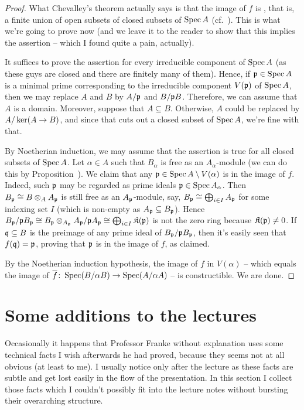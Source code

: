 \documentclass[a4paper,parskip=half,numbers=enddot, DIV=12]{scrreprt}
\begin{document}
\begin{proof}
	What Chevalley's theorem actually says is that the image of $f$ is , that is, a finite union of open subsets of closed subsets of $\operatorname{Spec} A$ (cf.\ \cite[Corollary~14.6]{eisenbudCommAlg}). This is what we're going to prove now (and we leave it to the reader to show that this implies the assertion -- which I found quite a pain, actually).
	
	It suffices to prove the assertion for every irreducible component of $\operatorname{Spec} A$ (as these guys are closed and there are finitely many of them). Hence, if $\mathfrak{p}\in\operatorname{Spec} A$ is a minimal prime corresponding to the irreducible component $V(\mathfrak{p})$ of $\operatorname{Spec} A$, then we may replace $A$ and $B$ by $A/\mathfrak{p}$ and $B/\mathfrak{p} B$. Therefore, we can assume that $A$ is a domain. Moreover, suppose that $A\subseteq B$. Otherwise, $A$ could be replaced by $A/\ker(A\morphism B)$, and since that cuts out a closed subset of $\operatorname{Spec} A$, we're fine with that. 
	
	By Noetherian induction, we may assume that the assertion is true for all closed subsets of $\operatorname{Spec} A$. Let $\alpha\in A$ such that $B_\alpha$ is free as an $A_\alpha$-module (we can do this by Proposition~). We claim that any $\mathfrak{p}\in\operatorname{Spec} A\setminus V(\alpha)$ is in the image of $f$. Indeed, such $\mathfrak{p}$ may be regarded as prime ideals $\mathfrak{p}\in\operatorname{Spec} A_\alpha$. Then $B_{\mathfrak{p}}\cong B\otimes_AA_{\mathfrak{p}}$ is still free as an $A_{\mathfrak{p}}$-module, say, $B_{\mathfrak{p}}\cong \bigoplus_{i\in I}A_{\mathfrak{p}}$ for some indexing set $I$ (which is non-empty as $A_{\mathfrak{p}}\subseteq B_{\mathfrak{p}}$). Hence $B_{\mathfrak{p}}/\mathfrak{p} B_{\mathfrak{p}}\cong B_{\mathfrak{p}}\otimes_{A_{\mathfrak{p}}}A_{\mathfrak{p}}/\mathfrak{p} A_{\mathfrak{p}}\cong \bigoplus_{i\in I}\mathfrak{K}(\mathfrak{p})$ is not the zero ring because $\mathfrak{K}(\mathfrak{p})\neq 0$. If $\mathfrak{q}\subseteq B$ is the preimage of any prime ideal of $B_{\mathfrak{p}}/\mathfrak{p} B_{\mathfrak{p}}$, then it's easily seen that $f(\mathfrak{q})=\mathfrak{p}$, proving that $\mathfrak{p}$ is in the image of $f$, as claimed.
	
	By the Noetherian induction hypothesis, the image of $f$ in $V(\alpha)$ -- which equals the image of $\ov{f}\colon\Spec(B/\alpha B)\morphism\Spec (A/\alpha A)$ -- is constructible. We are done.		
\end{proof}
\section{Some additions to the lectures}
Occasionally it happens that Professor Franke without explanation uses some technical facts I wish afterwards he had proved, because they seems not at all obvious (at least to me). I usually notice only after the lecture as these facts are subtle and get lost easily in the flow of the presentation. In this section I collect those facts which I couldn't possibly fit into the lecture notes without bursting their overarching structure.
\end{document}
